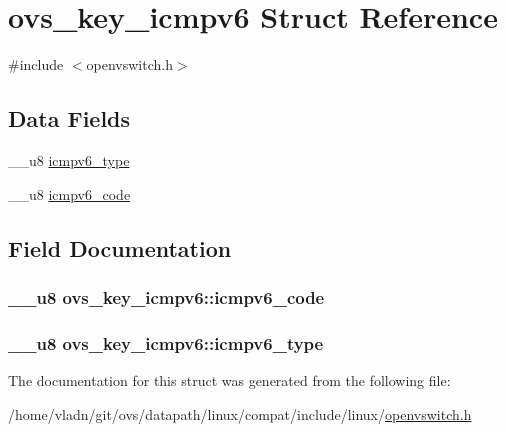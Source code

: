 \hypertarget{structovs__key__icmpv6}{}\section{ovs\+\_\+key\+\_\+icmpv6 Struct Reference}
\label{structovs__key__icmpv6}


{\ttfamily \#include $<$openvswitch.\+h$>$}

\subsection*{Data Fields}
\begin{DoxyCompactItemize}
\item 
\+\_\+\+\_\+u8 \hyperlink{structovs__key__icmpv6_a2bc3cf02c7b239b7f6f316aa26d9950e}{icmpv6\+\_\+type}
\item 
\+\_\+\+\_\+u8 \hyperlink{structovs__key__icmpv6_a3c3aab85ec0e772e50fbff5c9848558c}{icmpv6\+\_\+code}
\end{DoxyCompactItemize}


\subsection{Field Documentation}
\hypertarget{structovs__key__icmpv6_a3c3aab85ec0e772e50fbff5c9848558c}{}
\subsubsection[{icmpv6\+\_\+code}]{\setlength{\rightskip}{0pt plus 5cm}\+\_\+\+\_\+u8 ovs\+\_\+key\+\_\+icmpv6\+::icmpv6\+\_\+code}\label{structovs__key__icmpv6_a3c3aab85ec0e772e50fbff5c9848558c}
\hypertarget{structovs__key__icmpv6_a2bc3cf02c7b239b7f6f316aa26d9950e}{}
\subsubsection[{icmpv6\+\_\+type}]{\setlength{\rightskip}{0pt plus 5cm}\+\_\+\+\_\+u8 ovs\+\_\+key\+\_\+icmpv6\+::icmpv6\+\_\+type}\label{structovs__key__icmpv6_a2bc3cf02c7b239b7f6f316aa26d9950e}


The documentation for this struct was generated from the following file\+:\begin{DoxyCompactItemize}
\item 
/home/vladn/git/ovs/datapath/linux/compat/include/linux/\hyperlink{openvswitch_8h}{openvswitch.\+h}\end{DoxyCompactItemize}
